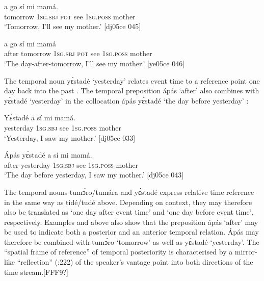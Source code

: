 \ea%
    \label{ex:key:1010}
    \gll {}    a    go  sí  mi    mamá.\\
tomorrow  \textsc{1sg.sbj}  \textsc{pot}  see  \textsc{1sg.poss}  mother\\

\glt ‘Tomorrow, I’ll see my mother.’ [dj05ce 045] 
\z


\ea%
    \label{ex:key:1011}
    \gll {}      a    go  sí  mi    mamá\\
after  tomorrow  \textsc{1sg.sbj}  \textsc{pot}  see  \textsc{1sg.poss}  mother\\

\glt ‘The day-after-tomorrow, I’ll see my mother.’ [ye05ce 046]
\z

The temporal noun yɛ́stadé ‘yesterday’ relates event time to a reference point one day back into the past . The temporal preposition ápás ‘after’ also combines with yɛ́stadé ‘yesterday’ in the collocation ápás yɛ́stadé ‘the day before yesterday’ : 


\ea%
    \label{ex:key:1012}
    \gll Yɛ́stadé    a    sí  mi    mamá.\\
yesterday  \textsc{1sg.sbj}  see  \textsc{1sg.poss}  mother\\

\glt ‘Yesterday, I saw my mother.’ [dj05ce 033]
\z


\ea%
    \label{ex:key:1013}
    \gll \'{A}pás  yɛ́stadé    a    sí  mi    mamá.\\
after  yesterday  \textsc{1sg.sbj}  see  \textsc{1sg.poss}  mother\\

\glt ‘The day before yesterday, I saw my mother.’ [dj05ce 043]
\z

The temporal nouns tumɔ́ro/tumára and yɛ́stadé express relative time reference in the same way as tidé/tudé above. Depending on context, they may therefore also be translated as ‘one day after event time’ and ‘one day before event time’, respectively. Examples  and  above also show that the preposition ápás ‘after’ may be used to indicate both a posterior and an anterior temporal relation. \'{A}pás may therefore be combined with tumɔ́ro ‘tomorrow’ as well as yɛ́stadé ‘yesterday’. The “spatial frame of reference” \citep[24]{Levinson2003} of temporal posteriority is characterised by a mirror-like “reflection” (\citealt{BenderBannardo2005}:222) of the speaker’s vantage point into both directions of the time stream.[FFF9?]


